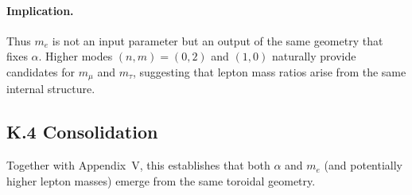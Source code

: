 \paragraph{Implication.}
Thus $m_e$ is not an input parameter but an output of the same geometry that 
fixes $\alpha$. Higher modes $(n,m)=(0,2)$ and $(1,0)$ naturally provide 
candidates for $m_\mu$ and $m_\tau$, suggesting that lepton mass ratios arise 
from the same internal structure.

\subsection*{K.4 Consolidation}
Together with Appendix~V, this establishes that both $\alpha$ and $m_e$ (and 
potentially higher lepton masses) emerge from the same toroidal geometry.
